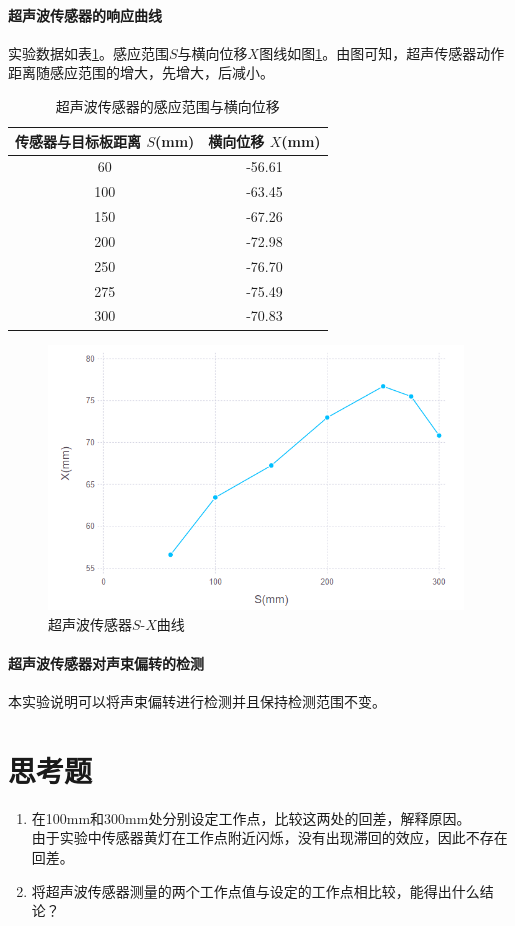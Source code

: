 \paragraph{超声波传感器的响应曲线}
实验数据如表\ref{tab:lh}。感应范围$S$与横向位移$X$图线如图\ref{fig:lsx}。由图可知，超声传感器动作距离随感应范围的增大，先增大，后减小。
\begin{table}[htbp]
	\centering
	\begin{tabular}{|c|c|}
		\hline
		传感器与目标板距离 $S$(mm) & 横向位移 $X$(mm) \\
		\hline
		60 & -56.61 \\
		100 & -63.45 \\
		150 & -67.26 \\
		200 & -72.98 \\
		250 & -76.70 \\
		275 & -75.49 \\
		300 & -70.83 \\
		\hline
	\end{tabular}
	\caption{超声波传感器的感应范围与横向位移}
	\label{tab:lh}
\end{table}

\begin{figure}[htbp]
\centering
\includegraphics[width=11cm]{resource/lsx.png}
\caption{超声波传感器$S$-$X$曲线}
\label{fig:lsx}
\end{figure}

\paragraph{超声波传感器对声束偏转的检测}
本实验说明可以将声束偏转进行检测并且保持检测范围不变。

\section{思考题}
\begin{enumerate}
\item 在100mm和300mm处分别设定工作点，比较这两处的回差，解释原因。\\
由于实验中传感器黄灯在工作点附近闪烁，没有出现滞回的效应，因此不存在回差。
\item 将超声波传感器测量的两个工作点值与设定的工作点相比较，能得出什么结论？\\
\end{enumerate}


